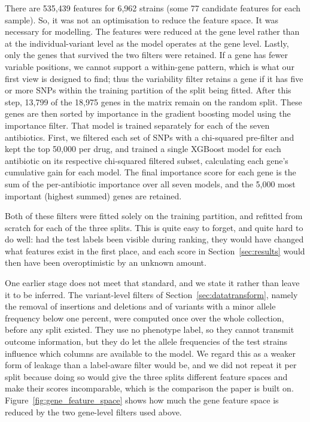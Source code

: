\documentclass[journal]{IEEEtran}
\begin{document}
There are 535,439 features for 6,962 strains (some 77 candidate features for each
sample). So, it was not an optimisation to reduce the feature space. It was
necessary for modelling. The features were reduced at the gene level rather than at
the individual-variant level as the model operates at the gene level. Lastly, only
the genes that survived the two filters were retained. If a gene has fewer variable
positions, we cannot support a within-gene pattern, which is what our first view is
designed to find; thus the variability filter retains a gene if it has five or more
SNPs within the training partition of the split being fitted. After this step, 13,799
of the 18,975 genes in the matrix remain on the random split. These genes are then sorted by importance in the gradient boosting
model \cite{chen2016xgboost} using the importance filter. That model is trained
separately for each of the seven antibiotics. First, we filtered each set of SNPs
with a chi-squared pre-filter and kept the top 50,000 per drug, and trained a single
XGBoost model for each antibiotic on its respective chi-squared filtered subset,
calculating each gene's cumulative gain for each model. The final importance score
for each gene is the sum of the per-antibiotic importance over all seven models, and
the 5,000 most important (highest summed) genes are retained.

Both of these filters were fitted solely on the training partition, and refitted from
scratch for each of the three splits. This is quite
easy to forget, and quite hard to do well: had the test labels been visible during
ranking, they would have changed what features exist in the first place, and each
score in Section~\ref{sec:results} would then have been overoptimistic by an unknown
amount.

One earlier stage does not meet that standard, and we state it rather than leave it to
be inferred. The variant-level filters of Section~\ref{sec:datatransform}, namely the
removal of insertions and deletions and of variants with a minor allele frequency below
one percent, were computed once over the whole collection, before any split existed. They
use no phenotype label, so they cannot transmit outcome information, but they do let the
allele frequencies of the test strains influence which columns are available to the
model. We regard this as a weaker form of leakage than a label-aware filter would be, and
we did not repeat it per split because doing so would give the three splits different
feature spaces and make their scores incomparable, which is the comparison the paper is
built on. Figure~\ref{fig:gene_feature_space} shows how much the gene feature space is
reduced by the two gene-level filters used above.
\end{document}
